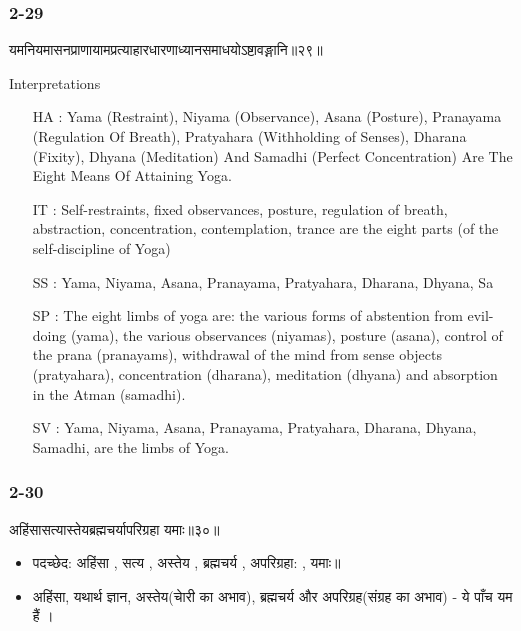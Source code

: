 \begin{frame}[fragile]\frametitle{2-29}
\begin{sanskrit}
यमनियमासनप्राणायामप्रत्याहारधारणाध्यानसमाधयोऽष्टावङ्गानि॥२९॥
\end{sanskrit}

Interpretations
\begin{itemize}
\item [HA]: Yama (Restraint), Niyama (Observance), Asana (Posture), Pranayama (Regulation Of Breath), Pratyahara (Withholding of Senses), Dharana (Fixity), Dhyana (Meditation) And Samadhi (Perfect Concentration) Are The Eight Means Of Attaining Yoga.
\item [IT]: Self-restraints, fixed observances, posture, regulation of breath, abstraction, concentration, contemplation, trance are the eight parts (of the self-discipline of Yoga)
\item [SS]:  Yama, Niyama, Asana, Pranayama, Pratyahara, Dharana, Dhyana, Sa
\item [SP]: The eight limbs of yoga are: the various forms of abstention from evil-doing (yama), the various observances (niyamas), posture (asana), control of the prana (pranayams), withdrawal of the mind from sense objects (pratyahara), concentration (dharana), meditation (dhyana) and absorption in the Atman (samadhi).
\item [SV]: Yama, Niyama, Asana, Pranayama, Pratyahara, Dharana, Dhyana, Samadhi, are the limbs of Yoga. 
\end{itemize}
\end{frame}

\begin{frame}[fragile]\frametitle{2-30}
\begin{sanskrit}
अहिंसासत्यास्तेयब्रह्मचर्यापरिग्रहा यमाः॥३०॥
\end{sanskrit}

\begin{itemize}
\item पदच्छेद: अहिंसा , सत्य , अस्तेय , ब्रह्मचर्य , अपरिग्रहा: , यमाः॥
\item अहिंसा, यथार्थ ज्ञान, अस्तेय(चाेरी का अभाव), ब्रह्मचर्य और अपरिग्रह(संग्रह का अभाव) - ये पाँच यम हैं ।
\end{itemize}	
	
\end{frame}

